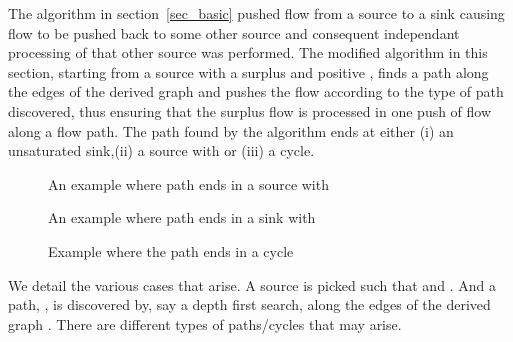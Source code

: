 \documentclass[11pt]{article}
\begin{document}
The algorithm in section~\ref{sec_basic} pushed flow from a source to a sink 
causing flow
to be pushed back to some other source and consequent independant processing of
that  other source was performed.
The modified algorithm in this section, starting from a source with 
a surplus and positive , finds a path along the edges 
of the derived graph  and pushes  the flow according to the type of path discovered,
thus ensuring that the surplus flow is processed in one push of flow along
a flow path.
The path found by the algorithm ends at either
(i)  an unsaturated sink,(ii) a source with  or (iii) a cycle.  










\begin{figure}\centerline{\epsfysize=200pt}
\caption{ An example where path ends in a source with } 
\end{figure}


\begin{figure}\centerline{\epsfysize=200pt}
\caption{ An example where path ends in a sink with } 
\end{figure}



\begin{figure}\centerline{\epsfysize=200pt}
\caption{ Example where the path ends in a cycle}
\end{figure}

We detail the various cases that arise.
A source  is picked such that  and 
.
And  a  path, , is discovered by, say a depth first search,
along the edges of the derived graph .
There are  different types of paths/cycles that may arise.
\end{document}
